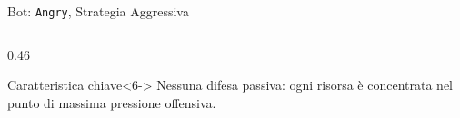 \documentclass[9pt,serif,usenames,dvipsnames]{beamer}
\begin{document}
\begin{frame}{\centering Bot: \texttt{Angry}, Strategia Aggressiva}
\begin{columns}[T]
\begin{column}{0.46\textwidth}
\begin{center}
				\end{center}
				\vspace{0.3cm}
				\begin{alertblock}{Caratteristica chiave}<6->
					\small
					\alert{Nessuna difesa passiva}: ogni risorsa è concentrata
					nel punto di massima pressione offensiva.
				\end{alertblock}
			\end{column}
		\end{columns}
	\end{frame}
\end{document}
